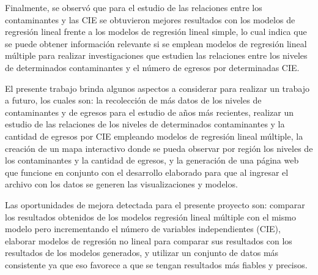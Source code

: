 \documentclass[3p,times]{elsarticle}
\begin{document}
Finalmente, se observó que para el estudio de las relaciones entre los contaminantes y las CIE se obtuvieron mejores resultados con los modelos de regresión lineal frente a los modelos de regresión lineal simple, lo cual indica que se puede obtener información relevante si se emplean modelos de regresión lineal múltiple para realizar investigaciones que estudien las relaciones entre los niveles de determinados contaminantes y el número de egresos por determinadas CIE.

El presente trabajo brinda algunos aspectos a considerar para realizar un trabajo a futuro, los cuales son: la recolección de más datos de los niveles de contaminantes y de egresos para el estudio de años más recientes, realizar un estudio de las relaciones de los niveles de determinados contaminantes y la cantidad de egresos por CIE empleando modelos de regresión lineal múltiple, la creación de un mapa interactivo donde se pueda observar por región los niveles de los contaminantes y la cantidad de egresos, y la generación de una página web que funcione en conjunto con el desarrollo elaborado para que al ingresar el archivo con los datos se generen las visualizaciones y modelos.

Las oportunidades de mejora detectada para el presente proyecto son: comparar los resultados obtenidos de los modelos regresión lineal múltiple con el mismo modelo pero incrementando el número de variables independientes (CIE), elaborar modelos de regresión no lineal para comparar sus resultados con los resultados de los modelos generados, y utilizar un conjunto de datos más consistente ya que eso favorece a que se tengan resultados más fiables y precisos.














\end{document}
